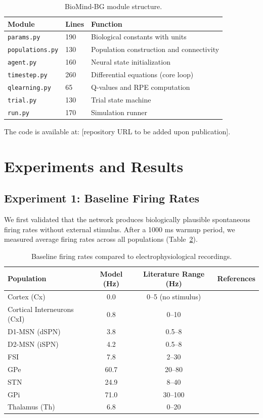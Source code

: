\documentclass[11pt,a4paper]{article}
\begin{document}
\begin{table}[h]
\centering
\caption{BioMind-BG module structure.}
\label{tab:modules}
\begin{tabular}{lll}
\toprule
Module & Lines & Function \\
\midrule
\texttt{params.py} & 190 & Biological constants with units \\
\texttt{populations.py} & 130 & Population construction and connectivity \\
\texttt{agent.py} & 160 & Neural state initialization \\
\texttt{timestep.py} & 260 & Differential equations (core loop) \\
\texttt{qlearning.py} & 65 & Q-values and RPE computation \\
\texttt{trial.py} & 130 & Trial state machine \\
\texttt{run.py} & 170 & Simulation runner \\
\bottomrule
\end{tabular}
\end{table}

The code is available at: [repository URL to be added upon publication].

\section{Experiments and Results}

\subsection{Experiment 1: Baseline Firing Rates}

We first validated that the network produces biologically plausible spontaneous firing rates without external stimulus. After a 1000 ms warmup period, we measured average firing rates across all populations (Table~\ref{tab:baseline}).

\begin{table}[h]
\centering
\caption{Baseline firing rates compared to electrophysiological recordings.}
\label{tab:baseline}
\begin{tabular}{lccc}
\toprule
Population & Model (Hz) & Literature Range (Hz) & References \\
\midrule
Cortex (Cx) & 0.0 & 0--5 (no stimulus) & \citet{constantinidis2002} \\
Cortical Interneurons (CxI) & 0.8 & 0--10 & \citet{markram2004} \\
D1-MSN (dSPN) & 3.8 & 0.5--8 & \citet{berke2004} \\
D2-MSN (iSPN) & 4.2 & 0.5--8 & \citet{berke2004} \\
FSI & 7.8 & 2--30 & \citet{berke2004} \\
GPe & 60.7 & 20--80 & \citet{delong1971} \\
STN & 24.9 & 8--40 & \citet{wichmann1994} \\
GPi & 71.0 & 30--100 & \citet{delong1971} \\
Thalamus (Th) & 6.8 & 0--20 & \citet{sherman2001} \\
\bottomrule
\end{tabular}
\end{table}
\end{document}
